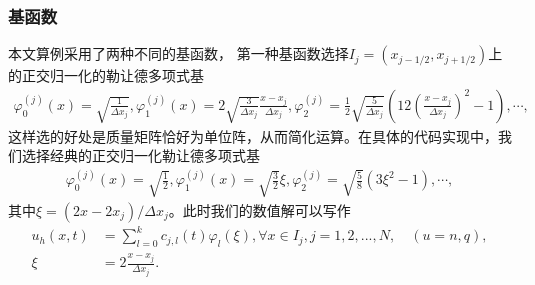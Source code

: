 \subsubsection{基函数}
本文算例采用了两种不同的基函数，
第一种基函数选择$I_j = (x_{j-1/2}, x_{j+1/2})$上的正交归一化的勒让德多项式基
\begin{align*}
    \varphi_0^{(j)}(x) = \sqrt{\frac{1}{\Delta x_j}}, \varphi_1^{(j)}(x) = 2\sqrt{\frac{3}{\Delta x_j}}\frac{x-x_j}{\Delta x_j}, \varphi_2^{(j)} =\frac{1}{2}\sqrt{\frac{5}{\Delta x_j}}(12(\frac{x-x_j}{\Delta x_j})^2 - 1 ), \cdots,
\end{align*}
这样选的好处是质量矩阵恰好为单位阵，从而简化运算。在具体的代码实现中，我们选择经典的正交归一化勒让德多项式基
\begin{align*}
    \varphi_0^{(j)}(x) = \sqrt{\frac{1}{2}}, \varphi_1^{(j)}(x) = \sqrt{\frac{3}{2}}\xi, \varphi_2^{(j)} =\sqrt{\frac{5}{8}}(3\xi^2- 1 ), \cdots,
\end{align*}
其中$\xi = (2x-2x_j)/\Delta x_j$。此时我们的数值解可以写作
\begin{align*}
    u_h(x,t) & = \sum_{l=0}^k c_{j,l}(t)\varphi_{l}(\xi), \forall x \in I_j , j= 1,2,...,N, \quad (u = n,q), \\
    \xi      & = 2\frac{x-x_j}{\Delta x_j}.
\end{align*}

